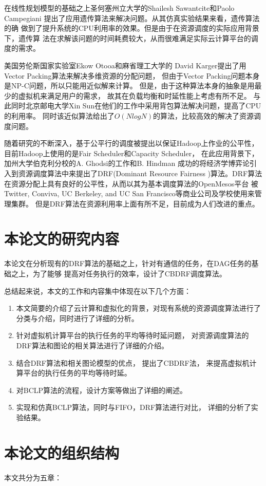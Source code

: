 在线性规划模型的基础之上圣何塞州立大学的Shailesh Sawantcite和Paolo Campegiani
提出了应用遗传算法来解决问题。从其仿真实验结果来看，遗传算法的确
做到了提升系统的CPU利用率的效果。但是由于在资源调度的实际应用背景下，遗传算
法在求解该问题的时间耗费较大，从而很难满足实际云计算平台的调度的需求。

美国劳伦斯国家实验室Ekow Otooa和麻省理工大学的
David Karger提出了用Vector Packing算法来解决多维资源的分配问题，
但由于Vector Packing问题本身是NP-C问题，所以只能用近似解来计算。
但是，由于这种算法本身的抽象是用最少的虚拟机来满足用户的需求，
故其在负载均衡和时延性能上考虑有所不足。
与此同时北京邮电大学Xin Sun在他们的工作中采用背包算法解决问题，提高了CPU的利用率。
同时该近似算法给出了$O(NlogN)$的算法，比较高效的解决了资源调度问题。


随着研究的不断深入，基于公平行的调度被提出以保证Hadoop上作业的公平性，
目前Hadoop上使用的是Fair Scheduler和Capacity Scheduler，
在此应用背景下，加州大学伯克利分校的A. Ghodsi的工作和B. Hindman
成功的将经济学博弈论引入到资源调度算法中来提出了DRF(Dominant Resource Fairness
)算法。DRF算法在资源分配上具有良好的公平性，从而以其为基本调度算法的OpenMesos平台
被Twitter, Conviva, UC Berkeley, and UC San Francisco等商业公司及学校使用来管理集群。
但是DRF算法在资源利用率上面有所不足，目前成为人们改进的重点。

\section{本论文的研究内容}
本论文在分析现有的DRF算法的基础之上，针对有通信的任务，在DAG任务的基础之上，为了能够
提高对任务执行的效率，设计了CBDRF调度算法。

总结起来说，本文的工作和内容集中体现在以下几个方面：
\begin{enumerate}
  \item 本文简要的介绍了云计算和虚拟化的背景，对现有系统的资源调度算法进行了
	分类与介绍，同时进行了详细的分析。
  \item 针对虚拟机计算平台的执行任务的平均等待时延问题，
	对资源调度算法的DRF算法和图论的相关算法进行了详细的介绍。
  \item 结合DRF算法和相关图论模型的优点，
	提出了CBDRF法，
	来提高虚拟机计算平台的执行任务的平均等待时延。
  \item 对BCLP算法的流程，设计方案等做出了详细的阐述。
  \item 实现和仿真BCLP算法，同时与FIFO，DRF算法进行对比，
	详细的分析了实验结果。
\end{enumerate}


\section{本论文的组织结构}
本文共分为五章：

